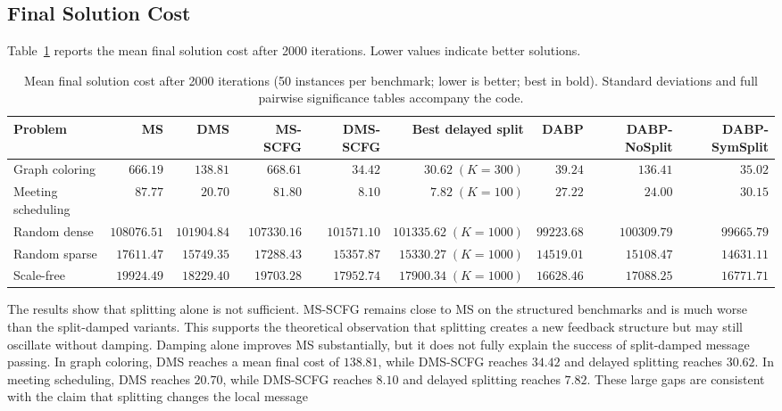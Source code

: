 \documentclass[letterpaper]{article} %
\theoremstyle{definition}
\theoremstyle{remark}
\begin{document}
\subsection{Final Solution Cost}
Table~\ref{tab:final_costs} reports the mean final solution cost after 2000
iterations.  Lower values indicate better solutions.
\begin{table}[t]
\centering
\caption{Mean final solution cost after 2000 iterations (50 instances per
benchmark; lower is better; best in bold).  Standard deviations and full
pairwise significance tables accompany the code.}
\label{tab:final_costs}
\scriptsize
\begin{tabular}{lrrrrrrrr}
\toprule
\textbf{Problem}
& \textbf{MS}
& \textbf{DMS}
& \textbf{MS-SCFG}
& \textbf{DMS-SCFG}
& \textbf{Best delayed split}
& \textbf{DABP}
& \textbf{DABP-NoSplit}
& \textbf{DABP-SymSplit} \\
\midrule
Graph coloring
& $666.19$
& $138.81$
& $668.61$
& $34.42$
& $\mathbf{30.62}\;(K{=}300)$
& $39.24$
& $136.41$
& $35.02$ \\
Meeting scheduling
& $87.77$
& $20.70$
& $81.80$
& $8.10$
& $\mathbf{7.82}\;(K{=}100)$
& $27.22$
& $24.00$
& $30.15$ \\
Random dense
& $108076.51$
& $101904.84$
& $107330.16$
& $101571.10$
& $101335.62\;(K{=}1000)$
& $\mathbf{99223.68}$
& $100309.79$
& $99665.79$ \\
Random sparse
& $17611.47$
& $15749.35$
& $17288.43$
& $15357.87$
& $15330.27\;(K{=}1000)$
& $\mathbf{14519.01}$
& $15108.47$
& $14631.11$ \\
Scale-free
& $19924.49$
& $18229.40$
& $19703.28$
& $17952.74$
& $17900.34\;(K{=}1000)$
& $\mathbf{16628.46}$
& $17088.25$
& $16771.71$ \\
\bottomrule
\end{tabular}
\end{table}
The results show that splitting alone is not sufficient.  MS-SCFG remains close
to MS on the structured benchmarks and is much worse than the split-damped
variants.  This supports the theoretical observation that splitting creates a
new feedback structure but may still oscillate without damping.
Damping alone improves MS substantially, but it does not fully explain the
success of split-damped message passing.  In graph coloring, DMS reaches a
mean final cost of $138.81$, while DMS-SCFG reaches $34.42$ and delayed
splitting reaches $30.62$.  In meeting scheduling, DMS reaches $20.70$, while
DMS-SCFG reaches $8.10$ and delayed splitting reaches $7.82$.  These large
gaps are consistent with the claim that splitting changes the local message
\end{document}
